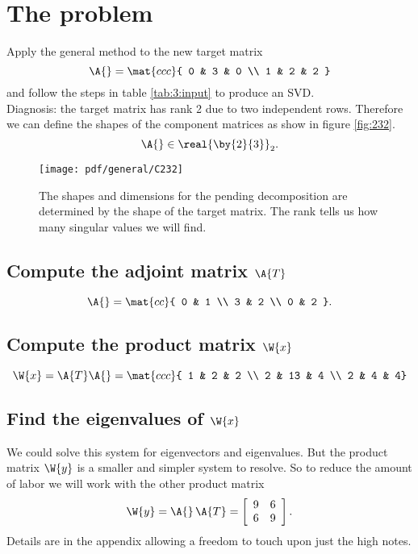 \section{The problem}
Apply the general method to the new target matrix
\begin{equation}
  \A{} = \mat{ccc}
  {
  0 & 3 & 0 \\
  1 & 2 & 2
  }
\end{equation}
and follow the steps in table \eqref{tab:3:input} to produce an SVD.\\

Diagnosis: the target matrix has rank 2 due to two independent rows. Therefore we can define the shapes of the component matrices as show in figure \eqref{fig:232}.
\begin{equation}
  \A{}\in\real{\by{2}{3}}_{2}.
\end{equation}
\begin{figure}[htbp] %
   \centering
   \texttt{[image: pdf/general/C232]} 
   \caption[Shapes and dimensions]{The shapes and dimensions for the pending decomposition are determined by the shape of the target matrix. The rank tells us how many singular values we will find.}
   \label{fig:232}
\end{figure}

\subsection{Compute the adjoint matrix $\A{T}$}
\begin{equation}
  \A{} = \mat{cc}
  {
  0 & 1 \\
  3 & 2 \\
  0 & 2
  }.
\end{equation}

\subsection{Compute the product matrix $\W{x}$}
\begin{equation}
  \W{x}=\A{T}\A{}= \mat{ccc}{
 1 &  2 & 2 \\
 2 & 13 & 4 \\
 2 &  4 & 4}
\label{eq:problemgen:Wx}
\end{equation}

\subsection{Find the eigenvalues of $\W{x}$}
We could solve this system for eigenvectors and eigenvalues. But the product matrix $\W{y}$ is a smaller and simpler system to resolve. So to reduce the amount of labor we will work with the other product matrix
\begin{equation}
  \W{y}=\A{}\,\A{T} =
\left[
\begin{array}{cc}
 9 & 6 \\
 6 & 9
\end{array}
\right].
\label{eq:problemgen:Wy}
\end{equation}
Details are in the appendix allowing a freedom to touch upon just the high notes. 

